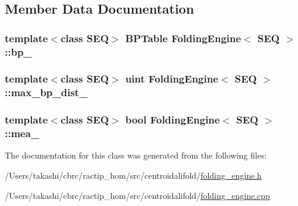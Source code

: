 \subsection{Member Data Documentation}
\hypertarget{class_folding_engine_a9b9bda82bd46da0a8a41e22be459e559}{
\subsubsection[{bp\+\_\+}]{\setlength{\rightskip}{0pt plus 5cm}template$<$class S\+E\+Q$>$ {\bf B\+P\+Table} {\bf Folding\+Engine}$<$ S\+E\+Q $>$\+::bp\+\_\+\hspace{0.3cm}{\ttfamily [protected]}}}\label{class_folding_engine_a9b9bda82bd46da0a8a41e22be459e559}
\hypertarget{class_folding_engine_a9f810b5b55a05965f5421b201185e5fa}{
\subsubsection[{max\+\_\+bp\+\_\+dist\+\_\+}]{\setlength{\rightskip}{0pt plus 5cm}template$<$class S\+E\+Q$>$ {\bf uint} {\bf Folding\+Engine}$<$ S\+E\+Q $>$\+::max\+\_\+bp\+\_\+dist\+\_\+\hspace{0.3cm}{\ttfamily [protected]}}}\label{class_folding_engine_a9f810b5b55a05965f5421b201185e5fa}
\hypertarget{class_folding_engine_a73c7910614a8894d3334dbebd1fe1b35}{
\subsubsection[{mea\+\_\+}]{\setlength{\rightskip}{0pt plus 5cm}template$<$class S\+E\+Q$>$ bool {\bf Folding\+Engine}$<$ S\+E\+Q $>$\+::mea\+\_\+\hspace{0.3cm}{\ttfamily [protected]}}}\label{class_folding_engine_a73c7910614a8894d3334dbebd1fe1b35}


The documentation for this class was generated from the following files\+:\begin{DoxyCompactItemize}
\item 
/\+Users/takashi/cbrc/ractip\+\_\+hom/src/centroidalifold/\hyperlink{folding__engine_8h}{folding\+\_\+engine.\+h}\item 
/\+Users/takashi/cbrc/ractip\+\_\+hom/src/centroidalifold/\hyperlink{folding__engine_8cpp}{folding\+\_\+engine.\+cpp}\end{DoxyCompactItemize}
